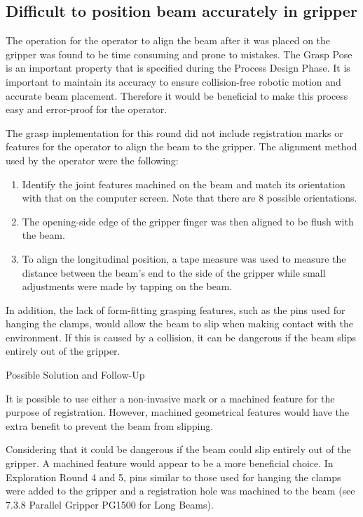\subsection{Difficult to position beam accurately in gripper}
\label{subsection:exploration_2_difficult_to_position_beam_accurately_in_gripper}

The operation for the operator to align the beam after it was placed on the gripper was found to be time consuming and prone to mistakes. The Grasp Pose is an important property that is specified during the Process Design Phase. It is important to maintain its accuracy to ensure collision-free robotic motion and accurate beam placement. Therefore it would be beneficial to make this process easy and error-proof for the operator.

The grasp implementation for this round did not include registration marks or features for the operator to align the beam to the gripper. The alignment method used by the operator were the following:

\begin{enumerate}
    \item Identify the joint features machined on the beam and match its orientation with that on the computer screen. Note that there are 8 possible orientations.
    \item The opening-side edge of the gripper finger was then aligned to be flush with the beam.
    \item To align the longitudinal position, a tape measure was used to measure the distance between the beam’s end to the side of the gripper while small adjustments were made by tapping on the beam. 
\end{enumerate}

In addition, the lack of form-fitting grasping features, such as the pins used for hanging the clamps, would allow the beam to slip when making contact with the environment. If this is caused by a collision, it can be dangerous if the beam slips entirely out of the gripper.

Possible Solution and Follow-Up

It is possible to use either a non-invasive mark or a machined feature for the purpose of registration. However, machined geometrical features would have the extra benefit to prevent the beam from slipping. 

Considering that it could be dangerous if the beam could slip entirely out of the gripper. A machined feature would appear to be a more beneficial choice. In Exploration Round 4 and 5, pins similar to those used for hanging the clamps were added to the gripper and a registration hole was machined to the beam (see 7.3.8 Parallel Gripper PG1500 for Long Beams).


